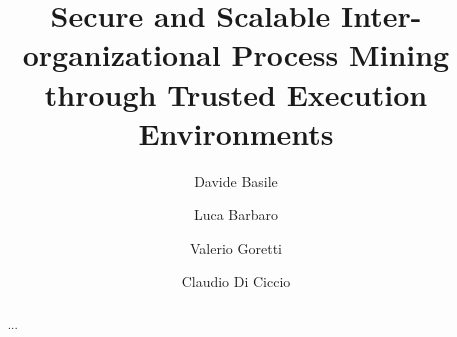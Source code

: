 \documentclass[runningheads]{llncs}
\begin{document}
%
\title{
}
%
%
\author{Davide Basile \and
Luca Barbaro \and
Valerio Goretti \and Claudio Di Ciccio}
%
%
%
\title{Secure and Scalable Inter-organizational Process Mining through Trusted Execution Environments}
\maketitle

\begin{abstract}
...
\end{abstract}













\end{document}
